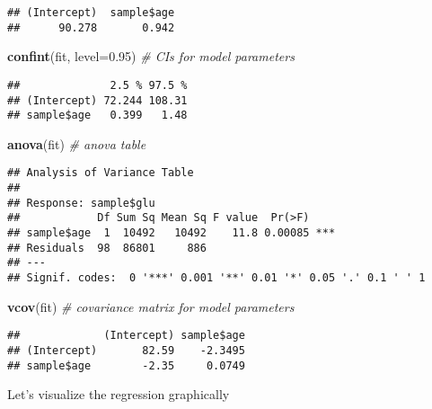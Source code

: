 \documentclass[]{book}
\newenvironment{Shaded}{\begin{snugshade}}{\end{snugshade}}
\newcommand{\KeywordTok}[1]{\textcolor[rgb]{0.13,0.29,0.53}{\textbf{#1}}}
\newcommand{\DataTypeTok}[1]{\textcolor[rgb]{0.13,0.29,0.53}{#1}}
\newcommand{\DecValTok}[1]{\textcolor[rgb]{0.00,0.00,0.81}{#1}}
\newcommand{\FloatTok}[1]{\textcolor[rgb]{0.00,0.00,0.81}{#1}}
\newcommand{\StringTok}[1]{\textcolor[rgb]{0.31,0.60,0.02}{#1}}
\newcommand{\CommentTok}[1]{\textcolor[rgb]{0.56,0.35,0.01}{\textit{#1}}}
\newcommand{\OperatorTok}[1]{\textcolor[rgb]{0.81,0.36,0.00}{\textbf{#1}}}
\newcommand{\NormalTok}[1]{#1}
\theoremstyle{definition}
\theoremstyle{definition}
\theoremstyle{definition}
\theoremstyle{remark}
\begin{document}
\begin{verbatim}
## (Intercept)  sample$age 
##      90.278       0.942
\end{verbatim}

\begin{Shaded}
\begin{Highlighting}[]
\KeywordTok{confint}\NormalTok{(fit, }\DataTypeTok{level=}\FloatTok{0.95}\NormalTok{) }\CommentTok{# CIs for model parameters }
\end{Highlighting}
\end{Shaded}

\begin{verbatim}
##              2.5 % 97.5 %
## (Intercept) 72.244 108.31
## sample$age   0.399   1.48
\end{verbatim}

\begin{Shaded}
\begin{Highlighting}[]
\KeywordTok{anova}\NormalTok{(fit) }\CommentTok{# anova table }
\end{Highlighting}
\end{Shaded}

\begin{verbatim}
## Analysis of Variance Table
## 
## Response: sample$glu
##            Df Sum Sq Mean Sq F value  Pr(>F)    
## sample$age  1  10492   10492    11.8 0.00085 ***
## Residuals  98  86801     886                    
## ---
## Signif. codes:  0 '***' 0.001 '**' 0.01 '*' 0.05 '.' 0.1 ' ' 1
\end{verbatim}

\begin{Shaded}
\begin{Highlighting}[]
\KeywordTok{vcov}\NormalTok{(fit) }\CommentTok{# covariance matrix for model parameters }
\end{Highlighting}
\end{Shaded}

\begin{verbatim}
##             (Intercept) sample$age
## (Intercept)       82.59    -2.3495
## sample$age        -2.35     0.0749
\end{verbatim}

Let's visualize the regression graphically

\begin{Shaded}
\end{Shaded}
\end{document}
